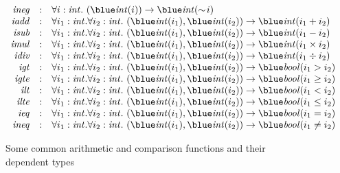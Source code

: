 \begin{figure}[thp]
\[\begin{array}{rcl}
{\it ineg} & : & \forall i:\sint.~(\tint(i))\timp\tint(\sim\!i) \\
{\it iadd} & : & \forall i_1:\sint.\forall i_2:\sint.~(\tint(i_1), \tint(i_2))\timp\tint(i_1+i_2) \\
{\it isub} & : & \forall i_1:\sint.\forall i_2:\sint.~(\tint(i_1), \tint(i_2))\timp\tint(i_1-i_2) \\
{\it imul} & : & \forall i_1:\sint.\forall i_2:\sint.~(\tint(i_1), \tint(i_2))\timp\tint(i_1\times i_2) \\
{\it idiv} & : & \forall i_1:\sint.\forall i_2:\sint.~(\tint(i_1), \tint(i_2))\timp\tint(i_1\div i_2) \\
{\it igt} & : & \forall i_1:\sint.\forall i_2:\sint.~(\tint(i_1), \tint(i_2))\timp\tbool(i_1>i_2) \\
{\it igte} & : & \forall i_1:\sint.\forall i_2:\sint.~(\tint(i_1), \tint(i_2))\timp\tbool(i_1\geq i_2) \\
{\it ilt} & : & \forall i_1:\sint.\forall i_2:\sint.~(\tint(i_1), \tint(i_2))\timp\tbool(i_1<i_2) \\
{\it ilte} & : & \forall i_1:\sint.\forall i_2:\sint.~(\tint(i_1), \tint(i_2))\timp\tbool(i_1\leq i_2) \\
{\it ieq} & : & \forall i_1:\sint.\forall i_2:\sint.~(\tint(i_1), \tint(i_2))\timp\tbool(i_1=i_2) \\
{\it ineq} & : & \forall i_1:\sint.\forall i_2:\sint.~(\tint(i_1), \tint(i_2))\timp\tbool(i_1\not=i_2) \\
\end{array}\]
\caption{Some common arithmetic and comparison functions and their
dependent types}
\label{figure:arithmetic_comparison_functions}
\end{figure}
